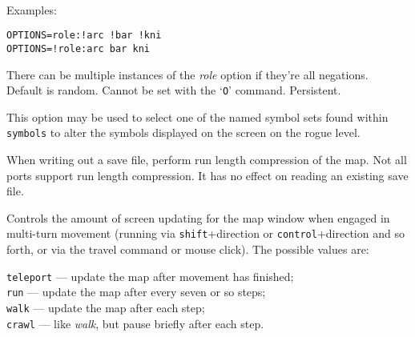 \\
Examples:
\\
\begin{verbatim}
OPTIONS=role:!arc !bar !kni
OPTIONS=!role:arc bar kni
\end{verbatim}
There can be multiple instances of the {\it role\/}
option if they're all negations.
\\
Default is random.
Cannot be set with the `{\tt O}' command.  Persistent.
\item[\ib{roguesymset}]
This option may be used to select one of the named symbol sets found within
{\tt symbols} to alter the symbols displayed on the screen on the
rogue level.
\item[\ib{rlecomp}]
When writing out a save file, perform run length compression of the map.
Not all ports support run length compression. It has no
effect on reading an existing save file.
\item[\ib{runmode}]
Controls the amount of screen updating for the map window when engaged
in multi-turn movement (running via {\tt shift}+direction
or {\tt control}+direction
and so forth, or via the travel command or mouse click).
The possible values are:

{\tt teleport} --- update the map after movement has finished;\\
{\tt run} --- update the map after every seven or so steps;\\
{\tt walk} --- update the map after each step;\\
{\tt crawl} --- like {\it walk\/}, but pause briefly after each step.


